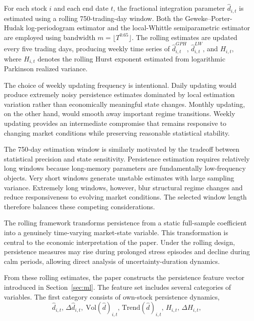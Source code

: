 \documentclass[unnumsec,webpdf,contemporary,large]{oup-authoring-template}%
\theoremstyle{thmstyleone}%
\theoremstyle{thmstyletwo}%
\theoremstyle{thmstylethree}%
\begin{document}
For each stock $i$ and each end date $t$, the fractional integration
parameter $ \hat{d}_{i,t}$ is estimated using a rolling 750-trading-day
window. Both the Geweke--Porter-Hudak log-periodogram estimator and the
local-Whittle semiparametric estimator are employed using bandwidth
$m = \lfloor T^{0.65}\rfloor$. The rolling estimates are updated every
five trading days, producing weekly time series of
$ \hat{d}_{i,t}^{GPH}$, $ \hat{d}_{i,t}^{LW}$, and $H_{i,t}$, where $H_{i,t}$
denotes the rolling Hurst exponent estimated from logarithmic Parkinson
realized variance.

The choice of weekly updating frequency is intentional. Daily updating
would produce extremely noisy persistence estimates dominated by local
estimation variation rather than economically meaningful state changes.
Monthly updating, on the other hand, would smooth away important regime
transitions. Weekly updating provides an intermediate compromise that
remains responsive to changing market conditions while preserving
reasonable statistical stability.

The 750-day estimation window is similarly motivated by the tradeoff
between statistical precision and state sensitivity. Persistence estimation
requires relatively long windows because long-memory parameters are
fundamentally low-frequency objects. Very short windows generate unstable
estimates with large sampling variance. Extremely long windows, however,
blur structural regime changes and reduce responsiveness to evolving market
conditions. The selected window length therefore balances these competing
considerations.

The rolling framework transforms persistence from a static full-sample
coefficient into a genuinely time-varying market-state variable. This
transformation is central to the economic interpretation of the paper.
Under the rolling design, persistence measures may rise during prolonged
stress episodes and decline during calm periods, allowing direct analysis
of uncertainty-duration dynamics.

From these rolling estimates, the paper constructs the persistence feature
vector introduced in Section~\ref{sec:ml}. The feature set includes several
categories of variables. The first category consists of own-stock
persistence dynamics,
\begin{equation}
  \hat{d}_{i,t},\, \Delta \hat{d}_{i,t},\;
  \mathrm{Vol}( \hat{d})_{i,t},\, \mathrm{Trend}( \hat{d})_{i,t},\,  H_{i,t},\, \Delta H_{i,t},
\end{equation}
\end{document}

